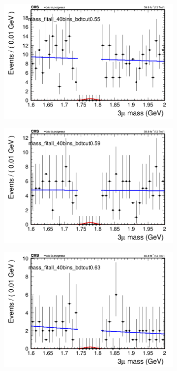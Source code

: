 \begin{figure}[H]
\begin{subfigure}{0.2\textwidth}
        \caption{}
    \end{subfigure}
    \begin{subfigure}{0.2\textwidth}
        \includegraphics[width=\textwidth]{power_law/plots/all/massfit_all_40bins_bdtcut0.55.png}
        \caption{}
    \end{subfigure}
    \begin{subfigure}{0.2\textwidth}
        \includegraphics[width=\textwidth]{power_law/plots/all/massfit_all_40bins_bdtcut0.59.png}
        \caption{}
    \end{subfigure}
    \begin{subfigure}{0.2\textwidth}
        \includegraphics[width=\textwidth]{power_law/plots/all/massfit_all_40bins_bdtcut0.63.png}

\end{subfigure}
\end{figure}
